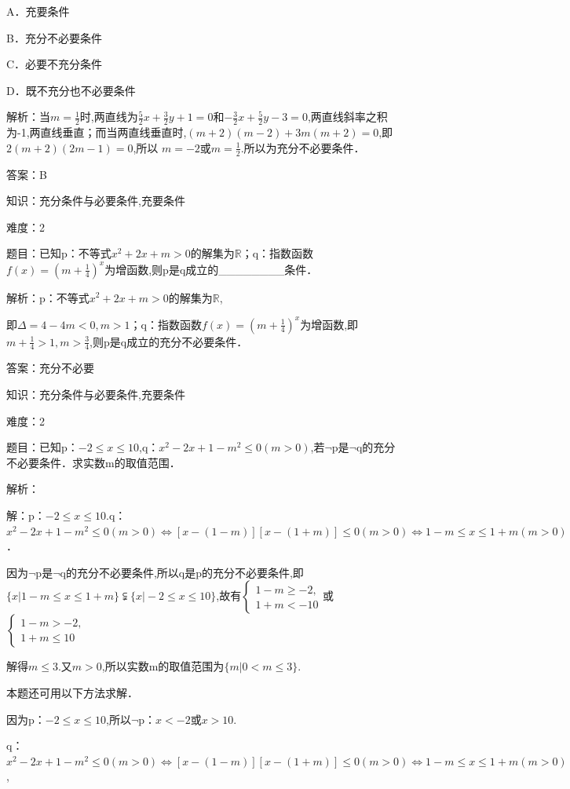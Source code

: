 \documentclass{article} %
\begin{document}
A．充要条件

B．充分不必要条件

C．必要不充分条件

D．既不充分也不必要条件

解析：当$m=\frac{1}{2}$时,两直线为$\frac{5}{2}x+\frac{3}{2}y+1=0$和$-\frac{3}{2}x+\frac{5}{2}y-3=0$,两直线斜率之积为-1,两直线垂直；而当两直线垂直时,$(m+2)(m-2)+3m(m+2)=0$,即$2(m+2)(2m-1)=0$,所以 $m=-2$或$m=\frac{1}{2}$.所以为充分不必要条件．

答案：B



知识：充分条件与必要条件,充要条件

难度：2

题目：已知p：不等式$x^{2}+2x+m>0$的解集为$\mathbb{R}$；q：指数函数$f(x)=(m+\frac{1}{4})^x$为增函数,则p是q成立的\_\_\_\_\_\_\_\_条件．

解析：p：不等式$x^{2}+2x+m>0$的解集为$\mathbb{R}$,

即$\Delta=4-4m<0,m>1$；q：指数函数$f(x)=(m+\frac{1}{4})^x$为增函数,即$m+\frac{1}{4}>1,m>\frac{3}{4}$,则p是q成立的充分不必要条件．

答案：充分不必要



知识：充分条件与必要条件,充要条件

难度：2

题目：已知p：$-2\le x\le 10$,q：$x^{2}-2x+1-m^{2}\le0(m>0)$,若$\neg$p是$\neg$q的充分不必要条件．求实数m的取值范围．

解析：

解：p：$-2\le x\le 10$.q：$x^{2}-2x+1-m^{2}\le0(m>0)\Leftrightarrow [x-(1-m)][x-(1+m)]\le 0(m>0)\Leftrightarrow 1-m\le x \le 1+m(m>0)$．

因为$\neg$p是$\neg$q的充分不必要条件,所以q是p的充分不必要条件,即$\{x|1-m\le x\le 1+m\}\subsetneqq \{x|-2\le x\le 10 \}$,故有$\left\{
\begin{array}{l}
1-m\ge -2, \\
1+m<-10
\end{array}
\right.$或 $\left\{
\begin{array}{l}
1-m>-2, \\
1+m\le 10
\end{array}
\right.$

解得$m\le3$.又$m>0$,所以实数m的取值范围为$\{m|0<m\le 3 \}$.

本题还可用以下方法求解．

因为p：$-2\le x\le 10$,所以$\neg$p：$x<-2$或$x>10$.

q：$x^{2}-2x+1-m^{2}\le 0(m>0)\Leftrightarrow [x-(1-m)][x-(1+m)] \le 0(m>0) \Leftrightarrow 1-m \le x \le 1+m(m>0)$,
\end{document}
